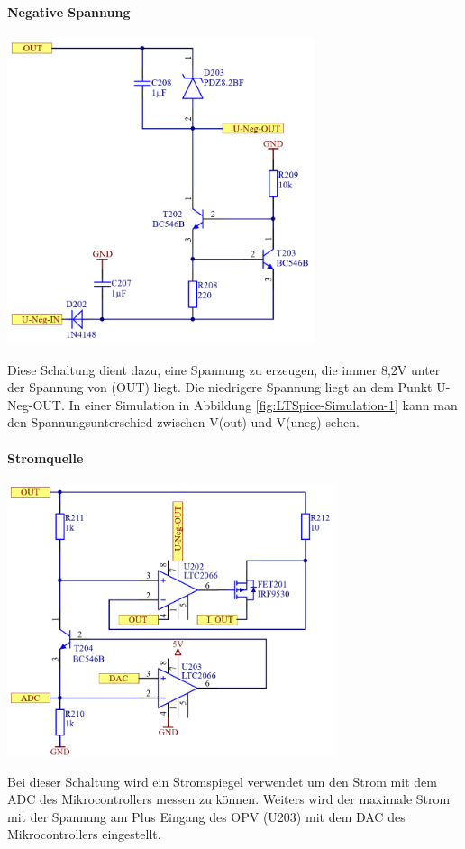 \documentclass[paper=a4, 12pt]{scrreprt}
\begin{document}
			\paragraph{Negative Spannung}
			\begin{adjustbox}{center,caption={Schaltung für Versorgung von OPV der Stromquelle},label={fig:neg-spg},nofloat=figure,vspace=\bigskipamount}
				\includegraphics[height=9cm]{img/Negative_Spannung.PNG}
			\end{adjustbox}
			Diese Schaltung dient dazu, eine Spannung zu erzeugen, die immer 8,2V unter der Spannung von (OUT) liegt. Die niedrigere Spannung liegt an dem Punkt U-Neg-OUT. In einer Simulation in Abbildung \ref{fig:LTSpice-Simulation-1} kann man den Spannungsunterschied zwischen V(out) und V(uneg) sehen.
			\paragraph{Stromquelle}
			\begin{adjustbox}{center,caption={Schaltung für die Einstellbare Stromquelle},label={fig:stromquelle},nofloat=figure,vspace=\bigskipamount}
				\includegraphics[height=8cm]{img/Stromquelle_SEPIC.PNG}
			\end{adjustbox}
			Bei dieser Schaltung wird ein Stromspiegel verwendet um den Strom mit dem ADC des Mikrocontrollers messen zu können. Weiters wird der maximale Strom mit der Spannung am Plus Eingang des OPV (U203) mit dem DAC des Mikrocontrollers eingestellt.
			
\end{document}
